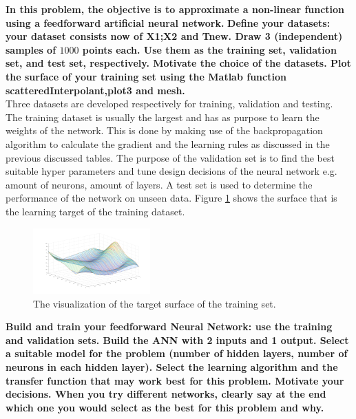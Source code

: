 \documentclass[a4paper,10pt]{article}
\begin{document}
\textbf{In this problem, the objective is to approximate a non-linear function using a feedforward artificial neural network.} \textbf{Define your datasets: your dataset consists now of X1;X2 and Tnew. Draw 3 (independent) samples of $ 1 000 $ 	points each. Use them as the training set, validation set, and test set, respectively. Motivate the choice of the 	datasets. Plot the surface of your training set using the Matlab function scatteredInterpolant,plot3 and mesh.}\\

Three datasets are developed respectively for training, validation and testing. The training dataset is usually the largest and has as purpose to learn the weights of the network. This is done by making use of the backpropagation algorithm to calculate the gradient and  the learning rules as discussed in the previous discussed tables. The purpose of the validation set is to find the best suitable hyper parameters and tune design decisions of the neural network e.g. amount of neurons, amount of layers. A test set is used to determine the performance of the network on unseen data. Figure \ref{fig:surface} shows the surface that is the learning target of the training dataset. 

\begin{figure}[h!]
	\centering
	\includegraphics[width=0.4\textwidth]{surface.png}
	\caption{The visualization of the target surface of the training set.}
	\label{fig:surface}
\end{figure}


\textbf{Build and train your feedforward Neural Network: use the training and validation sets. Build the ANN with 2	inputs and 1 output. Select a suitable model for the problem (number of hidden layers, number of neurons in each hidden layer). Select the learning algorithm and the transfer function that may work best for this problem.
	Motivate your decisions. When you try different networks, clearly say at the end which one you would select as
	the best for this problem and why.}\\
\end{document}
